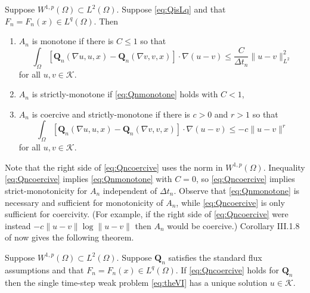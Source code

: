 \documentclass[final,leqno,onefignum,onetabnum]{siamltex1213bueler}
\newcommand\bQ{\mathbf{Q}}
\renewcommand{\grad}{\nabla}
\begin{document}
\begin{lemma}  \label{lem:monotonecoercive}  Suppose $W^{1,p}(\Omega) \subset L^2(\Omega)$.  Suppose \eqref{eq:QisLq} and that $F_n=F_n(x) \in L^q(\Omega)$.  Then
\renewcommand{\labelenumi}{(\roman{enumi})}
\begin{enumerate}
\item  $A_n$ is monotone if there is $C\le 1$ so that
\begin{equation}
\int_\Omega \left[\bQ_n(\grad u,u,x) - \bQ_n(\grad v,v,x)\right] \cdot \grad(u-v) \le \frac{C}{\Delta t_n} \|u-v\|_{L^2}^2 \label{eq:Qnmonotone}
\end{equation}
for all $u,v \in \mathcal{K}$.
\item  $A_n$ is strictly-monotone if \eqref{eq:Qnmonotone} holds with $C<1$,
\item  $A_n$ is coercive and strictly-monotone if there is $c>0$ and $r>1$ so that
\begin{equation}
\int_\Omega \left[\bQ_n(\grad u,u,x) - \bQ_n(\grad v,v,x)\right] \cdot \grad(u-v) \le - c \|u-v\|^r \label{eq:Qncoercive}
\end{equation}
for all $u,v \in \mathcal{K}$.
\end{enumerate}
\end{lemma}

Note that the right side of \eqref{eq:Qncoercive} uses the norm in $W^{1,p}(\Omega)$.  Inequality \eqref{eq:Qncoercive} implies \eqref{eq:Qnmonotone} with $C=0$, so \eqref{eq:Qncoercive} implies strict-monotonicity for $A_n$ independent of $\Delta t_n$.  Observe that \eqref{eq:Qnmonotone} is necessary and sufficient for monotonicity of $A_n$, while \eqref{eq:Qncoercive} is only sufficient for coercivity.  (For example, if the right side of \eqref{eq:Qncoercive} were instead $- c \|u-v\| \log \|u-v\|$ then $A_n$ would be coercive.)  Corollary III.1.8 of \cite{KinderlehrerStampacchia1980} now gives the following theorem.

\begin{theorem}  \label{thm:monowellposed}  Suppose $W^{1,p}(\Omega) \subset L^2(\Omega)$.  Suppose $\bQ_n$ satisfies the standard flux assumptions and that $F_n=F_n(x)\in L^q(\Omega)$.  If \eqref{eq:Qncoercive} holds for $\bQ_n$ then the single time-step weak problem \eqref{eq:theVI} has a unique solution $u\in\mathcal{K}$.
\end{theorem}
\end{document}
